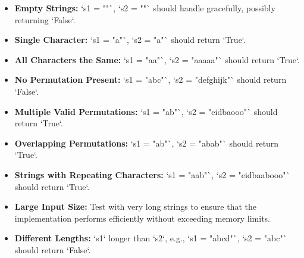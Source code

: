 \begin{itemize}
    \item \textbf{Empty Strings:} `s1 = ""`, `s2 = ""` should handle gracefully, possibly returning `False`.
    
    \item \textbf{Single Character:} `s1 = "a"`, `s2 = "a"` should return `True`.
    
    \item \textbf{All Characters the Same:} `s1 = "aa"`, `s2 = "aaaaa"` should return `True`.
    
    \item \textbf{No Permutation Present:} `s1 = "abc"`, `s2 = "defghijk"` should return `False`.
    
    \item \textbf{Multiple Valid Permutations:} `s1 = "ab"`, `s2 = "eidbaooo"` should return `True`.
    
    \item \textbf{Overlapping Permutations:} `s1 = "ab"`, `s2 = "abab"` should return `True`.
    
    \item \textbf{Strings with Repeating Characters:} `s1 = "aab"`, `s2 = "eidbaabooo"` should return `True`.
    
    \item \textbf{Large Input Size:} Test with very long strings to ensure that the implementation performs efficiently without exceeding memory limits.
    
    \item \textbf{Different Lengths:} `s1` longer than `s2`, e.g., `s1 = "abcd"`, `s2 = "abc"` should return `False`.
\end{itemize}

\printindex